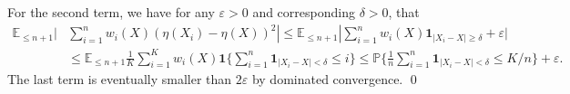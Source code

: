 \documentclass[a4paper,11pt]{article} %
\numberwithin{equation}{section}
\renewenvironment{proof}
  {{\noindent \itshape \color{gruvblue} Proof. }}{\color{gruvblue}\qed}
\theoremstyle{ndefinition}
\theoremstyle{nremark}
\theoremstyle{nplain}
\begin{document}
\begin{proof}
  For the second term, we have for any \( \varepsilon > 0 \) and corresponding
  \( \delta > 0 \), that 
  \begin{align*}
    \mathbb{E}_{\le n + 1} | 
      & 
      \sum_{i = 1}^{n} w_{i}(X) ( \eta(X_{i}) - \eta(X) )^{2} 
    | 
      \le \mathbb{E}_{\le n + 1} | 
            \sum_{i = 1}^{n} w_{i}(X) \mathbf{1}_{| X_{i} - X | \ge \delta} 
            + \varepsilon
          | 
    \\ 
    & \le \mathbb{E}_{\le n + 1}
          \frac{1}{K} \sum_{i = 1}^{K} 
          w_{i}(X) \mathbf{1} \Big\{ 
            \sum_{i = 1}^{n}
            \mathbf{1}_{| X_{i} - X | < \delta} \le i  
          \Big\} 
      \le \mathbb{P} \Big\{ 
            \frac{1}{n} 
            \sum_{i = 1}^{n} \mathbf{1}_{| X_{i} - X | < \delta}
            \le K / n 
          \Big\}    
          + \varepsilon. 
  \end{align*}
  The last term is eventually smaller than \( 2 \varepsilon \) by dominated
  convergence.
\end{proof}%



% 
% 
\end{document}
